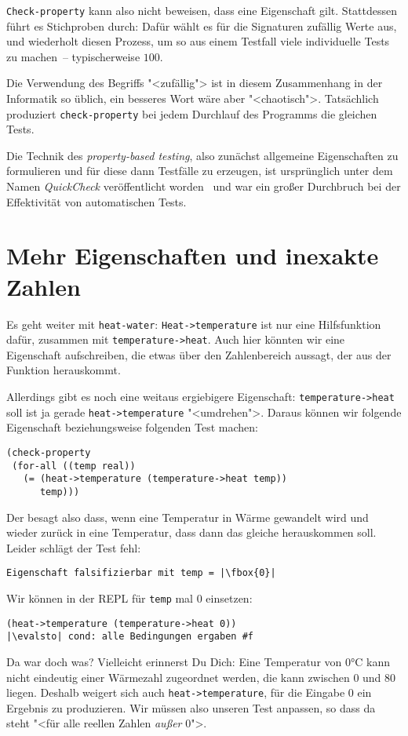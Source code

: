 \lstinline{Check-property} kann also nicht 
beweisen, dass eine Eigenschaft gilt.  Stattdessen führt es Stichproben durch: Dafür
wählt es für die Signaturen zufällig Werte aus, und
wiederholt diesen Prozess, um so aus einem Testfall viele individuelle
Tests zu machen~-- typischerweise $100$.

Die Verwendung des Begriffs "<zufällig"> ist in diesem Zusammenhang in
der Informatik so üblich, ein besseres Wort wäre aber "<chaotisch">.
Tatsächlich produziert \lstinline{check-property} bei jedem Durchlauf
des Programms die gleichen Tests.

Die Technik des \textit{property-based testing}, also zunächst
allgemeine Eigenschaften zu formulieren und für diese dann Testfälle
zu erzeugen, ist ursprünglich unter dem Namen \textit{QuickCheck}
veröffentlicht worden~\cite{ClaessenHughes2000} und war ein
großer Durchbruch bei der Effektivität von automatischen Tests.

\section{Mehr Eigenschaften und inexakte Zahlen}
\label{sec:inexakt}

Es geht weiter mit \lstinline{heat-water}:
\lstinline{Heat->temperature} ist nur eine Hilfsfunktion dafür,
zusammen mit \lstinline{temperature->heat}.  Auch hier könnten wir
eine Eigenschaft aufschreiben, die etwas über den Zahlenbereich
aussagt, der aus der Funktion herauskommt.

Allerdings gibt es noch eine weitaus ergiebigere Eigenschaft:
\lstinline{temperature->heat} soll ist ja gerade
\lstinline{heat->temperature} "<umdrehen">.  Daraus können wir
folgende Eigenschaft beziehungsweise folgenden Test machen:
%
\begin{lstlisting}
(check-property
 (for-all ((temp real))
   (= (heat->temperature (temperature->heat temp))
      temp)))
\end{lstlisting}
%
Der besagt also dass, wenn eine Temperatur in Wärme gewandelt wird und
wieder zurück in eine Temperatur, dass dann das gleiche herauskommen
soll.  Leider schlägt der Test fehl:
%
\begin{lstlisting}
Eigenschaft falsifizierbar mit temp = |\fbox{0}|
\end{lstlisting}
%
Wir können in der REPL für \lstinline{temp} mal $0$ einsetzen:
%
\begin{lstlisting}
(heat->temperature (temperature->heat 0))
|\evalsto| cond: alle Bedingungen ergaben #f
\end{lstlisting}
%
Da war doch was?  Vielleicht erinnerst Du Dich: Eine Temperatur von
$0$\si{\degree}C kann nicht eindeutig einer Wärmezahl zugeordnet werden,
die kann zwischen $0$ und $80$ liegen.  Deshalb weigert sich auch
\lstinline{heat->temperature}, für die Eingabe $0$ ein Ergebnis zu
produzieren.  Wir müssen also unseren Test anpassen, so dass da steht
"<für alle reellen Zahlen \emph{außer} $0$">.

